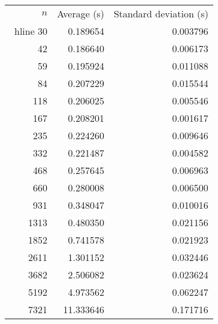 \begin{tabular}{rrr}
$n$& Average (s) & Standard deviation (s)\\\ hline
30& 0.189654& 0.003796\\
42& 0.186640& 0.006173\\
59& 0.195924& 0.011088\\
84& 0.207229& 0.015544\\
118& 0.206025& 0.005546\\
167& 0.208201& 0.001617\\
235& 0.224260& 0.009646\\
332& 0.221487& 0.004582\\
468& 0.257645& 0.006963\\
660& 0.280008& 0.006500\\
931& 0.348047& 0.010016\\
1313& 0.480350& 0.021156\\
1852& 0.741578& 0.021923\\
2611& 1.301152& 0.032446\\
3682& 2.506082& 0.023624\\
5192& 4.973562& 0.062247\\
7321& 11.333646& 0.171716\\
\end{tabular}
